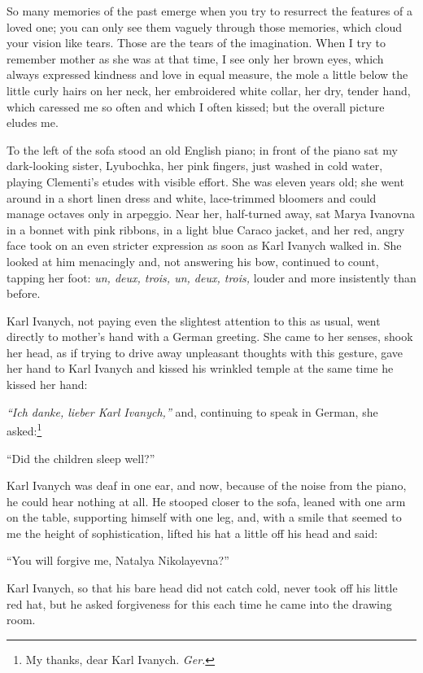 So many memories of the past emerge when you try to resurrect the features of a loved one; you can only see them vaguely through those memories, which cloud your vision like tears. Those are the tears of the imagination. When I try to remember mother as she was at that time, I see only her brown eyes, which always expressed kindness and love in equal measure, the mole a little below the little curly hairs on her neck, her embroidered white collar, her dry, tender hand, which caressed me so often and which I often kissed; but the overall picture eludes me.

To the left of the sofa stood an old English piano; in front of the piano sat my dark-looking sister, Lyubochka, her pink fingers, just washed in cold water, playing Clementi's etudes with visible effort. She was eleven years old; she went around in a short linen dress and white, lace-trimmed bloomers and could manage octaves only in arpeggio. Near her, half-turned away, sat Marya Ivanovna in a bonnet with pink ribbons, in a light blue Caraco jacket, and her red, angry face took on an even stricter expression as soon as Karl Ivanych walked in. She looked at him menacingly and, not answering his bow, continued to count, tapping her foot: \textit{un, deux, trois, un, deux, trois,} louder and more insistently than before.

Karl Ivanych, not paying even the slightest attention to this as usual, went directly to mother's hand with a German greeting. She came to her senses, shook her head, as if trying to drive away unpleasant thoughts with this gesture, gave her hand to Karl Ivanych and kissed his wrinkled temple at the same time he kissed her hand:

\textit{``Ich danke, lieber Karl Ivanych,''} and, continuing to speak in German, she asked:\footnote{My thanks, dear Karl Ivanych. \textit{Ger.}} %

``Did the children sleep well?'' %

Karl Ivanych was deaf in one ear, and now, because of the noise from the piano, he could hear nothing at all. He stooped closer to the sofa, leaned with one arm on the table, supporting himself with one leg, and, with a smile that seemed to me the height of sophistication, lifted his hat a little off his head and said:

``You will forgive me, Natalya Nikolayevna?'' %

Karl Ivanych, so that his bare head did not catch cold, never took off his little red hat, but he asked forgiveness for this each time he came into the drawing room.

